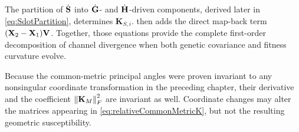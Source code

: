 \begin{connectionbox}
The partition of \(\dot{\mathbf{S}}\) into \(\dot{\mathbf{G}}\)- and \(\dot{\mathbf{H}}\)-driven components, derived later in \cref{eq:SdotPartition}, determines \(\mathbf K_{S,i}\).  then adds the direct map-back term \((\mathbf X_2-\mathbf X_1)\mathbf{V}\). Together, those equations provide the complete first-order decomposition of channel divergence when both genetic covariance and fitness curvature evolve.
\end{connectionbox}

Because the common-metric principal angles were proven invariant to any nonsingular coordinate transformation in the preceding chapter, their derivative and the coefficient \(\left\lVert \mathbf K_M\right\rVert_F^2\) are invariant as well. Coordinate changes may alter the matrices appearing in \cref{eq:relativeCommonMetricK}, but not the resulting geometric susceptibility.
